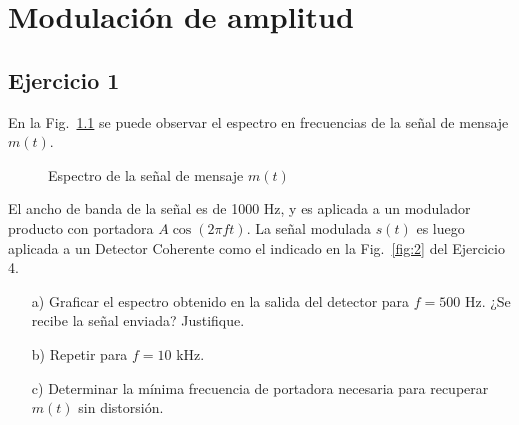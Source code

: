 \chapter{Modulación de amplitud}

\section{Ejercicio 1}  
En la Fig.~\ref{fig:1} se puede observar el espectro en frecuencias de la señal de mensaje $m(t)$.  

\begin{figure}[h!]
    \centering
    \caption{Espectro de la señal de mensaje $m(t)$}
    \label{fig:1}
\end{figure}

El ancho de banda de la señal es de 1000 Hz, y es aplicada a un modulador producto con portadora $A\cos(2\pi f t)$. La señal modulada $s(t)$ es luego aplicada a un Detector Coherente como el indicado en la Fig.~\ref{fig:2} del Ejercicio 4.  

\begin{itemize}
    \item[a)] Graficar el espectro obtenido en la salida del detector para $f=500$ Hz. ¿Se recibe la señal enviada? Justifique.  
    \item[b)] Repetir para $f=10$ kHz.  
    \item[c)] Determinar la mínima frecuencia de portadora necesaria para recuperar $m(t)$ sin distorsión.  
\end{itemize}